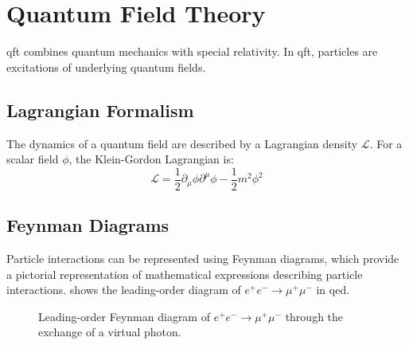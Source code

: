 \section{Quantum Field Theory}
\label{sec:THEORY_QUANTUM_FIELD_THEORY}

\Gls{qft} combines quantum mechanics with special relativity. In \gls{qft}, particles are excitations of underlying quantum fields.

\subsection{Lagrangian Formalism}
\label{sec:THEORY_QUANTUM_FIELD_THEORY_LAGRANGIAN_FORMALISM}

The dynamics of a quantum field are described by a Lagrangian density $\mathcal{L}$. For a scalar field $\phi$, the Klein-Gordon Lagrangian is:
\begin{equation}
  \mathcal{L} = \frac{1}{2}\partial_\mu\phi\partial^\mu\phi - \frac{1}{2}m^2\phi^2
  \label{eq:klein-gordon}
\end{equation}

\subsection{Feynman Diagrams}
\label{sec:THEORY_QUANTUM_FIELD_THEORY_FEYNMAN_DIAGRAMS}

Particle interactions can be represented using Feynman diagrams, which provide a pictorial representation of mathematical expressions describing particle interactions.  shows the leading-order diagram of $e^+e^- \to \mu^+\mu^-$ in \gls{qed}.

\begin{figure}[!ht]
  \centering
  
  \caption{Leading-order Feynman diagram of $e^+e^- \to \mu^+\mu^-$ through the exchange of a virtual photon.}
  \label{fig:THEORY_EE_MUMU}
\end{figure}

